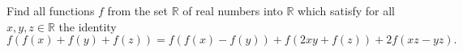 Find all functions $f$ from the set $\mathbb{R}$ of real numbers into $\mathbb{R}$ which satisfy for all $x, y, z \in \mathbb{R}$ the identity \[f(f(x)+f(y)+f(z))=f(f(x)-f(y))+f(2xy+f(z))+2f(xz-yz).\]
